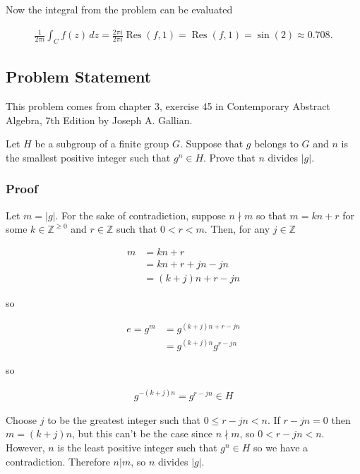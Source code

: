 \documentclass[12pt]{article}
\begin{document}
Now the integral from the problem can be evaluated

\begin{align}
  \frac{1}{2 \pi i} \int_{C} f(z)\,dz
    = \frac{2 \pi i}{2 \pi i} \operatorname{Res}(f,1)
    = \operatorname{Res}(f,1)
    = \sin(2)
    \approx 0.708.
\end{align}

\subsection{Problem Statement}

This problem comes from chapter 3, exercise 45 in Contemporary Abstract Algebra, 7th Edition by Joseph A. Gallian.

Let $H$ be a subgroup of a finite group $G$. Suppose that $g$ belongs to $G$ and $n$ is the smallest positive integer such that $g^n \in H$. Prove that $n$ divides $|g|$.

\subsubsection*{Proof}

Let $m = |g|$. For the sake of contradiction, suppose $n \nmid m$ so that $m = kn + r$ for some $k \in \mathbb{Z}^{\ge 0}$ and $r \in \mathbb{Z}$ such that $0 < r < m$. Then, for any $j \in \mathbb{Z}$

\begin{align}
  m &= kn + r \\
    &= kn + r + jn - jn \\
    &= (k + j)n + r - jn
\end{align}

so

\begin{align}
  e = g^m &= g^{(k + j)n + r - jn} \\
          &= g^{(k + j)n}g^{r - jn}
\end{align}

so

\begin{align}
  g^{-(k + j)n} = g^{r - jn} \in H
\end{align}

Choose $j$ to be the greatest integer such that $0 \le r - jn < n$. If $r - jn = 0$ then $m = (k + j)n$, but this can't be the case since $n \nmid m$, so $0 < r - jn < n$. However, $n$ is the least positive integer such that $g^n \in H$ so we have a contradiction. Therefore $n|m$, so $n$ divides $|g|$.
\end{document}
